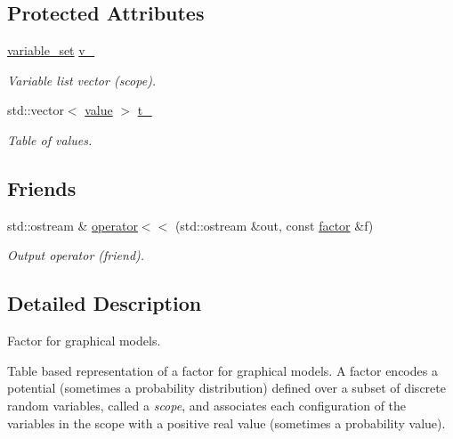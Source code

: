 \subsection*{Protected Attributes}
\begin{DoxyCompactItemize}
\item 
\hypertarget{classmerlin_1_1factor_a26c12d26a74f9bf173cc231bee6c5d31}{}\hyperlink{classmerlin_1_1variable__set}{variable\+\_\+set} \hyperlink{classmerlin_1_1factor_a26c12d26a74f9bf173cc231bee6c5d31}{v\+\_\+}\label{classmerlin_1_1factor_a26c12d26a74f9bf173cc231bee6c5d31}

\begin{DoxyCompactList}\small\item\em Variable list vector ({\itshape scope}). \end{DoxyCompactList}\item 
\hypertarget{classmerlin_1_1factor_a326ce3e061b41e7b77eb43aba23ba8fa}{}std\+::vector$<$ \hyperlink{classmerlin_1_1factor_a1b14d19e509403448fbef26b003c9281}{value} $>$ \hyperlink{classmerlin_1_1factor_a326ce3e061b41e7b77eb43aba23ba8fa}{t\+\_\+}\label{classmerlin_1_1factor_a326ce3e061b41e7b77eb43aba23ba8fa}

\begin{DoxyCompactList}\small\item\em Table of values. \end{DoxyCompactList}\end{DoxyCompactItemize}
\subsection*{Friends}
\begin{DoxyCompactItemize}
\item 
std\+::ostream \& \hyperlink{classmerlin_1_1factor_a030ca98ccee857e9de2af97fcf05b410}{operator$<$$<$} (std\+::ostream \&out, const \hyperlink{classmerlin_1_1factor}{factor} \&f)
\begin{DoxyCompactList}\small\item\em Output operator (friend). \end{DoxyCompactList}\end{DoxyCompactItemize}


\subsection{Detailed Description}
Factor for graphical models. 

Table based representation of a factor for graphical models. A factor encodes a potential (sometimes a probability distribution) defined over a subset of discrete random variables, called a {\itshape scope}, and associates each configuration of the variables in the scope with a positive real value (sometimes a probability value). 

